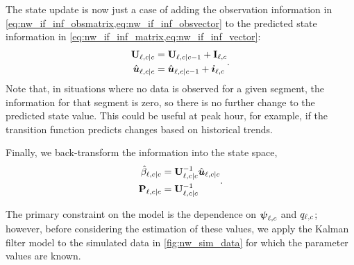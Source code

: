 The state update is now just a case of adding the observation information in \cref{eq:nw_if_inf_obsmatrix,eq:nw_if_inf_obsvector} to the predicted state information in \cref{eq:nw_if_inf_matrix,eq:nw_if_inf_vector}:
\begin{equation}
\label{eq:nw_if_update}
\begin{split}
\mathbf{U}_{\ell,c|c} &= \mathbf{U}_{\ell,c|c-1} + \mathbf{I}_{\ell,c} \\
\hat{\boldsymbol{u}}_{\ell,c|c} &= \hat{\boldsymbol{u}}_{\ell,c|c-1} + \boldsymbol{i}_{\ell,c}
\end{split}.
\end{equation}
Note that, in situations where no data is observed for a given segment, the information for that segment is zero, so there is no further change to the predicted state value. This could be useful at peak hour, for example, if the transition function predicts changes based on historical trends.


Finally, we back-transform the information into the state space,
\begin{equation}
\label{eq:nw_if_statespace}
\begin{split}
\hat{\beta}_{\ell,c|c} &= \mathbf{U}_{\ell,c|c}^{-1} \hat{\boldsymbol{u}}_{\ell,c|c} \\
\mathbf{P}_{\ell,c|c} &= \mathbf{U}_{\ell,c|c}^{-1}
\end{split}.
\end{equation}

The primary constraint on the model is the dependence on $\mathbf{\boldsymbol{\psi}}_{\ell,c}$ and $q_{\ell,c}$; however, before considering the estimation of these values, we apply the Kalman filter model to the simulated data in \cref{fig:nw_sim_data} for which the parameter values are known.


